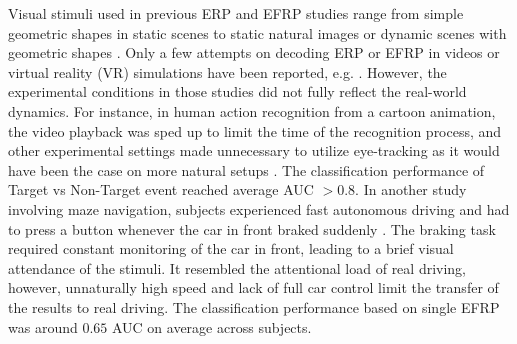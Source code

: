 \documentclass[12pt]{iopart}
\begin{document}
Visual stimuli used in previous ERP and EFRP studies range from simple geometric shapes
in static scenes to static natural images or dynamic
scenes with geometric shapes \cite{uscumlic_active_2016, devillez_p300_2015}.
Only a few attempts on decoding ERP or EFRP in videos or virtual reality (VR) simulations
have been reported, e.g. \cite{rosenthal_evoked_2014,jangraw_neurally_2014}. 
However, the experimental conditions in those studies did not fully
reflect the real-world dynamics.
For instance, in human action recognition from a cartoon animation, the video playback was sped up
to limit the time of the recognition process, and other experimental
settings made unnecessary to utilize eye-tracking 
as it would have been the case on more natural setups \cite{rosenthal_evoked_2014}.
The classification performance of Target vs Non-Target event reached average AUC $> 0.8$.
In another study involving maze navigation, subjects experienced fast autonomous driving
and had to press a button whenever the car in front braked suddenly \cite{jangraw_neurally_2014}.
The braking task required constant monitoring of the car in front, leading
to a brief visual attendance of the stimuli. It resembled the attentional load
of real driving, however, unnaturally high speed and lack of full car control
limit the transfer of the results to real driving.
The classification performance based on single EFRP 
was around $0.65$ AUC on average across subjects.

\end{document}
